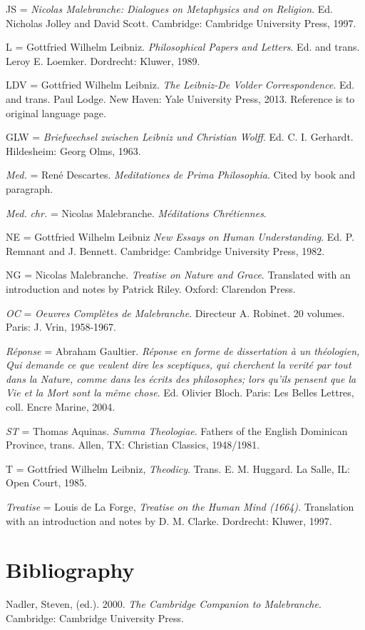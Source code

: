 \documentclass{article}
\begin{document}
JS = \emph{Nicolas Malebranche: Dialogues on Metaphysics and on
Religion}. Ed. Nicholas Jolley and David Scott. Cambridge: Cambridge
University Press, 1997.

L = Gottfried Wilhelm Leibniz. \emph{Philosophical Papers and Letters}.
Ed. and trans. Leroy E. Loemker. Dordrecht: Kluwer, 1989.

LDV = Gottfried Wilhelm Leibniz. \emph{The Leibniz-De Volder
Correspondence}. Ed. and trans. Paul Lodge. New Haven: Yale University
Press, 2013. Reference is to original language page.

GLW = \emph{Briefwechsel zwischen Leibniz und Christian Wolff}. Ed. C.
I. Gerhardt. Hildesheim: Georg Olms, 1963.

\emph{Med.} = René Descartes. \emph{Meditationes de Prima Philosophia}.
Cited by book and paragraph.

\emph{Med.} \emph{chr.} = Nicolas Malebranche. \emph{Méditations
Chrétiennes}.

NE = Gottfried Wilhelm Leibniz \emph{New Essays on Human Understanding}.
Ed. P. Remnant and J. Bennett. Cambridge: Cambridge University Press,
1982.

NG = Nicolas Malebranche. \emph{Treatise on Nature and Grace}.
Translated with an introduction and notes by Patrick Riley. Oxford:
Clarendon Press.

\emph{OC} = \emph{Oeuvres Complètes de Malebranche}. Directeur A.
Robinet. 20 volumes. Paris: J. Vrin, 1958-1967.

\emph{Réponse} = Abraham Gaultier. \emph{Réponse en forme de
dissertation à un théologien, Qui demande ce que veulent dire les
sceptiques, qui cherchent la verité par tout dans la Nature, comme dans
les écrits des philosophes; lors qu'ils pensent que la Vie et la Mort
sont la même chose}. Ed. Olivier Bloch. Paris: Les Belles Lettres, coll.
Encre Marine, 2004.

\emph{ST} = Thomas Aquinas. \emph{Summa Theologiae}. Fathers of the
English Dominican Province, trans. Allen, TX: Christian Classics,
1948/1981.

T = Gottfried Wilhelm Leibniz, \emph{Theodicy}. Trans. E. M. Huggard. La
Salle, IL: Open Court, 1985.

\emph{Treatise} = Louis de La Forge, \emph{Treatise on the Human Mind
(1664)}. Translation with an introduction and notes by D. M. Clarke.
Dordrecht: Kluwer, 1997.

\section{Bibliography}
Nadler, Steven, (ed.). 2000. \emph{The Cambridge Companion to
Malebranche}. Cambridge: Cambridge University Press.
\end{document}
